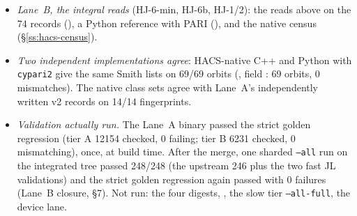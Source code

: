 \begin{itemize}
  Mazur's prime $5$, the negative controls $D=3,5,7$, $k=12$ are clean, generation over $\Z$ checked on 14/14 cells.
  HJ-A3: the T4 Betti side (\S\ref{ss:hacs-t4}). HJ-B0: the export format and 74  records
  (), whose fingerprints agree byte for byte with HACS's.
\item \emph{Lane~B, the integral reads} (HJ-6-min, HJ-6b, HJ-1/2): the reads above on the 74 records
  (), a Python reference with PARI (), and the native census
  (\S\ref{ss:hacs-census}).
\item \emph{Two independent implementations agree}: HACS-native C++ and Python with \texttt{cypari2} give the same Smith
  lists on 69/69 orbits (, field : 69 orbits, 0
  mismatches). The native class sets agree with Lane~A's independently written v2 records on 14/14 fingerprints.
\item \emph{Validation actually run.} The Lane~A binary passed the strict golden regression (tier A 12154 checked, 0
  failing; tier B 6231 checked, 0 mismatching), once, at build time. After the merge, one sharded \texttt{--all} run on the
  integrated tree passed 248/248 (the upstream 246 plus the two fast JL validations) and the strict golden regression again
  passed with 0 failures (Lane~B closure, \S7). Not run: the four digests, , the slow tier
  \texttt{--all-full}, the device lane.
\end{itemize}

